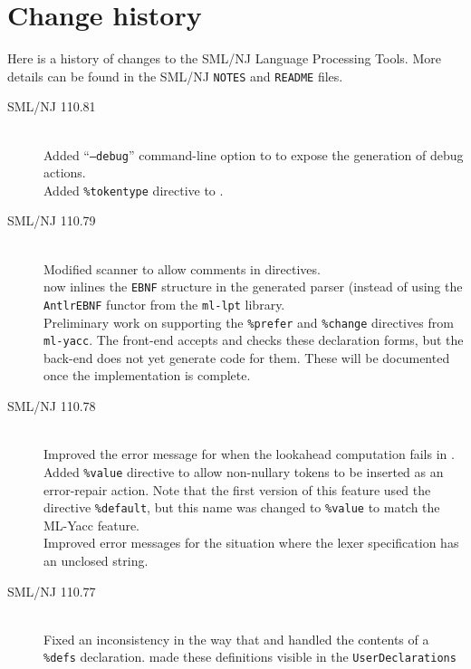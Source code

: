 %
\chapter{Change history}
\label{ch:history}

Here is a history of changes to the SML/NJ Language Processing Tools.
More details can be found in the SML/NJ \texttt{NOTES} and \texttt{README} files.
\begin{description}
  \item[SML/NJ 110.81]
    \mbox{}\\[0.5em]
    Added ``\texttt{--debug}'' command-line option to \mlantlr{} to expose the generation
    of debug actions.
    \\[0.5em]
    Added \texttt{\%tokentype} directive to \mlantlr{}.
%
 \item[SML/NJ 110.79]
    \mbox{}\\[0.5em]
    Modified scanner to allow comments in \ulex{} directives.
    \\[0.5em]
    \mlantlr{} now inlines the \texttt{EBNF} structure in the generated parser (instead of using
    the \texttt{AntlrEBNF} functor from the \texttt{ml-lpt} library.
    \\[0.5em]
    Preliminary work on supporting the \texttt{\%prefer} and \texttt{\%change} directives
    from \texttt{ml-yacc}.  The front-end accepts and checks these declaration forms, but
    the back-end does not yet generate code for them.  These will be documented once the
    implementation is complete.
%
  \item[SML/NJ 110.78]
    \mbox{}\\[0.5em]
    Improved the error message for when the lookahead computation fails in \mlantlr{}.
    \\[0.5em]
    Added \texttt{\%value} directive to allow non-nullary tokens to be inserted as
    an error-repair action.
    Note that the first version of this feature used the directive \texttt{\%default}, but
    this name was changed to \texttt{\%value} to match the ML-Yacc feature.
    \\[0.5em]
    Improved error messages for the situation where the lexer specification has an unclosed string.
%
  \item[SML/NJ 110.77]
    \mbox{}\\[0.5em]
    Fixed an inconsistency in the way that \mlantlr{} and \ulex{} handled the contents of
    a \texttt{\%defs} declaration.  \ulex{} made these definitions visible in the \texttt{UserDeclarations}

\end{description}
